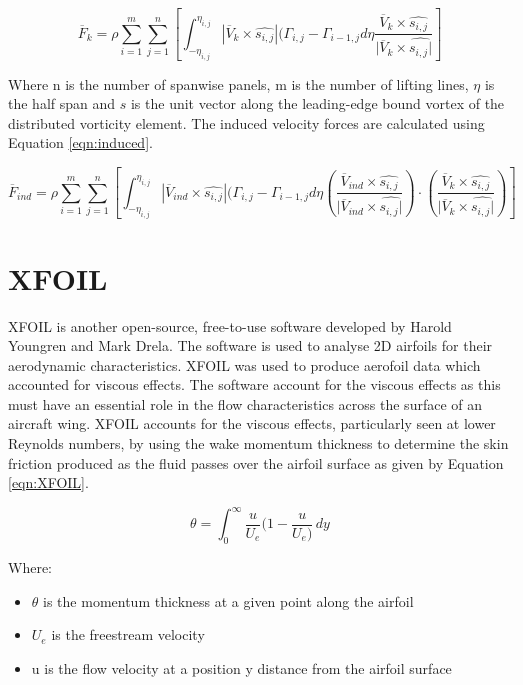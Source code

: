 \begin{equation}
\overline{F}_k = \rho \sum_{i=1}^{m} \sum_{j=1}^{n} \left[ \int_{-\eta_{i,j}}^{\eta_{i,j}} |\overline{V}_k \times  \hat{s_{i,j}} | (\Gamma_{i,j} - \Gamma_{i-1,j}d\eta \frac{ \overline{V}_k \times \hat{s_{i,j}} }{|\overline{V}_k \times \hat{s_{i,j}|}} \right]
\label{eqn:kinematic}
\end{equation}

Where n is the number of spanwise panels, m is the number of lifting lines, $\eta$ is the half span and $\hat{s}$ is the unit vector along the leading-edge bound vortex of the distributed vorticity element. The induced velocity forces are calculated using Equation \ref{eqn:induced}.

\begin{equation}
\overline{F}_{ind} = \rho \sum_{i=1}^{m} \sum_{j=1}^{n} \left[ \int_{-\eta_{i,j}}^{\eta_{i,j}} |\overline{V}_{ind} \times  \hat{s_{i,j}} | (\Gamma_{i,j} - \Gamma_{i-1,j}d\eta \left(\frac{ \overline{V}_{ind} \times \hat{s_{i,j}} }{|\overline{V}_{ind} \times \hat{s_{i,j}|}}\right) \cdot \left(\frac{ \overline{V}_k \times \hat{s_{i,j}} }{|\overline{V}_k \times \hat{s_{i,j}|}}\right) \right]
\label{eqn:induced}
\end{equation}






\section{XFOIL}
XFOIL is another open-source, free-to-use software developed by Harold Youngren and Mark Drela. The software is used to analyse 2D airfoils for their aerodynamic characteristics. XFOIL was used to produce aerofoil data which accounted for viscous effects. The software account for the viscous effects as this must have an essential role in the flow characteristics across the surface of an aircraft wing. XFOIL accounts for the viscous effects, particularly seen at lower Reynolds numbers, by using the wake momentum thickness to determine the skin friction produced as the fluid passes over the airfoil surface as given by Equation \ref{eqn:XFOIL}. 


\begin{equation}
    \theta = \int_{0}^{\infty} \frac{u}{U_e} ( 1 - \frac{u}{U_e) } \,dy
    \label{eqn:XFOIL}
\end{equation}

Where:
\begin{itemize}
    \item $\theta$ is the momentum thickness at a given point along the airfoil
    \item $U_e$ is the freestream velocity 
    \item u is the flow velocity at a position y distance from the airfoil surface
\end{itemize}

